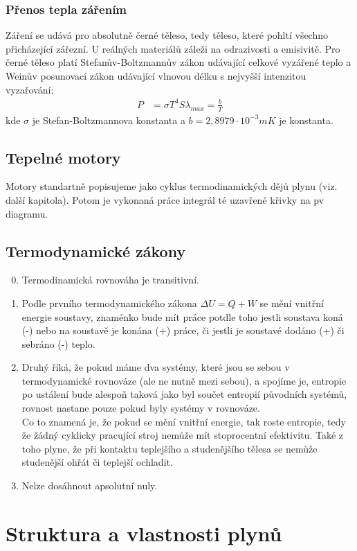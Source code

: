 \documentclass[titlepage]{report}
\begin{document}
\subsection{Přenos tepla zářením}
Záření se udává pro absolutně černé těleso, tedy těleso, které pohltí všechno přicházející zářezní. U reálných materiálů záleži na odrazivosti a emisivitě. Pro černé těleso platí Stefanův-Boltzmannův zákon udávající celkové vyzářené teplo a Weinův posunovací zákon udávající vlnovou délku s nejvyšší intenzitou vyzařování:
\begin{align}
P &= \sigma T^4 S
\lambda_{max} = \frac{b}{T}
\end{align}
kde $\sigma$ je Stefan-Boltzmannova konstanta a $b = 2,8979 \cdot 10^{-3} mK$ je konstanta.
\section{Tepelné motory}
Motory standartně popisujeme jako cyklus termodinamických dějů plynu (viz. další kapitola). Potom je vykonaná práce integrál té uzavřené křivky na pv diagramu.
\section{Termodynamické zákony}
\begin{enumerate}
\setcounter{enumi}{-1}
\item Termodinamická rovnováha je transitivní.
\item Podle prvního termodynamického zákona $\Delta U = Q + W$ se mění vnitřní energie soustavy, znaménko bude mít práce potdle toho jestli soustava koná (-) nebo na soustavě je konána (+) práce, či jestli je soustavé dodáno (+) či sebráno (-) teplo.
\item Druhý říká, že pokud máme dva systémy, které jsou se sebou v termodynamické rovnováze (ale ne nutně mezi sebou), a spojíme je, entropie po ustálení bude alespoň taková jako byl součet entropií původních systémů, rovnost nastane pouze pokud byly systémy v rovnováze.\\
Co to znamená je, že pokud se mění vnitřní energie, tak roste entropie, tedy že žádný cyklicky pracující stroj nemůže mít stoprocentní efektivitu. Také z toho plyne, že při kontaktu teplejšího a studenějšího tělesa se nemůže studenější ohřát či teplejší ochladit.
\item Nelze dosáhnout apsolutní nuly.
\end{enumerate}
\chapter{Struktura a vlastnosti plynů}
\end{document}
